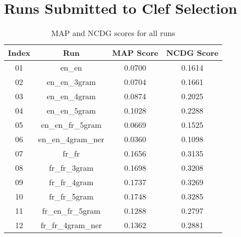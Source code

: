 \section{Runs Submitted to Clef Selection}
\label{sec:runs_selection}

\begin{table}[h!]
    \begin{center}
        \caption{MAP and NCDG scores for all runs}
        \label{tab:all_scores}
        \begin{tabular}{|c|c||c|c|}
            \hline
            \textbf{Index} & \textbf{Run} & \textbf{MAP Score} & \textbf{NCDG Score}\\
            \hline\hline
            01 & en\_en & \cellcolor{red!30!white}0.0700 & \cellcolor{red!30!white}0.1614 \\
            \hline
            02 & en\_en\_3gram & 0.0704 & 0.1661 \\
            \hline
            03 & en\_en\_4gram & 0.0874 & 0.2025 \\
            \hline
            04 & en\_en\_5gram & 0.1028 & 0.2288 \\
            \hline
            05 & en\_en\_fr\_5gram & \cellcolor{red!60!white}0.0669 & \cellcolor{red!60!white}0.1525 \\
            \hline
            06 & en\_en\_4gram\_ner & \cellcolor{red}0.0360 & \cellcolor{red}0.1098 \\
            \hline
            07 & fr\_fr & 0.1656 & 0.3135 \\
            \hline
            08 & fr\_fr\_3gram & \cellcolor{green!30!white}0.1698 & \cellcolor{green!30!white}0.3208 \\
            \hline
            09 & fr\_fr\_4gram & \cellcolor{green!60!white}0.1737 & \cellcolor{green!60!white}0.3269 \\
            \hline
            10 & fr\_fr\_5gram & \cellcolor{green}0.1748 & \cellcolor{green}0.3285 \\
            \hline
            11 & fr\_en\_fr\_5gram & 0.1288 & 0.2797 \\
            \hline
            12 & fr\_fr\_4gram\_ner & 0.1362 & 0.2881 \\
            \hline
        \end{tabular}
    \end{center}
\end{table}


